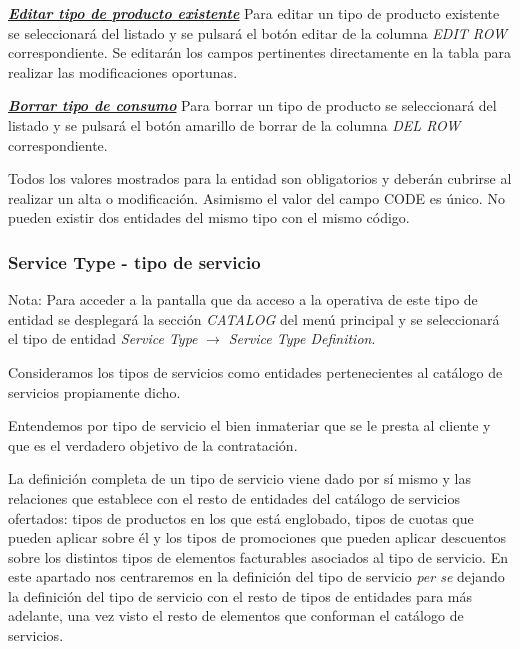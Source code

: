 \underline{\textsl{\textbf{Editar tipo de producto existente}}}\newline
Para editar un tipo de producto existente se seleccionará del listado y se pulsará el botón editar de la columna \textit{EDIT ROW} correspondiente. Se editarán los campos pertinentes directamente en la tabla para realizar las modificaciones oportunas. 

\underline{\textsl{\textbf{Borrar tipo de consumo}}}\newline
Para borrar un tipo de producto se seleccionará del listado y se pulsará el botón amarillo de borrar de la columna \textit{DEL ROW} correspondiente.\newline

Todos los valores mostrados para la entidad son obligatorios y deberán cubrirse al realizar un alta o modificación. Asimismo el valor del campo CODE es único. No pueden existir dos entidades del mismo tipo con el mismo código.




\subsubsection{Service Type - tipo de servicio}
\label{sub:service-type}

Nota: Para acceder a la pantalla que da acceso a la operativa de este tipo de entidad se desplegará la sección \emph{CATALOG} del menú principal y se seleccionará el tipo de entidad \emph{Service Type} $\rightarrow$  \emph{Service Type Definition}.

Consideramos los tipos de servicios como entidades pertenecientes al catálogo de servicios propiamente dicho.

Entendemos por tipo de servicio el bien inmateriar que se le presta al cliente y que es el verdadero objetivo de la contratación.

La definición completa de un tipo de servicio viene dado por sí mismo y las relaciones que establece con el resto de entidades del catálogo de servicios ofertados: tipos de productos en los que está englobado, tipos de cuotas que pueden aplicar sobre él y los tipos de promociones que pueden aplicar descuentos sobre los distintos tipos de elementos facturables asociados al tipo de servicio. En este apartado nos centraremos en la definición del tipo de servicio \textit{per se} dejando la definición del tipo de servicio con el resto de tipos de entidades para más adelante, una vez visto el resto de elementos que conforman el catálogo de servicios.

